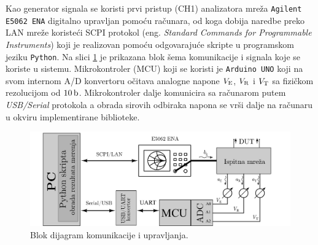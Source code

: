 \documentclass[a4paper, 12pt, diplomski]{etf}
\renewcommand{\unit}[1]{\,{\rm #1}}   %
\begin{document}
%
Kao generator signala se koristi prvi pristup (CH1)
analizatora mreža 
 \texttt{Agilent E5062 ENA} digitalno upravljan pomoću računara, od koga dobija naredbe 
 preko LAN mreže koristeći SCPI protokol (eng. \textit{Standard Commands for Programmable Instruments}) koji je realizovan pomoću odgovarajuće 
 skripte u programskom jeziku \texttt{Python}. Na slici \ref{fig:sna_complete_comm} je prikazana blok šema komunikacije i signala 
 koje se koriste u sistemu. Mikrokontroler (MCU)
 koji se koristi je
 \texttt{Arduino UNO} koji na svom internom A/D konvertoru 
 očitava analogne napone $V_{\rm E}$, $V_{\rm R}$ i $V_{\rm T}$
 sa fizičkom rezolucijom od $10\unit{b}$.
% 
Mikrokontroler dalje komunicira sa računarom putem 
\textit{USB/Serial} protokola a obrada sirovih odbiraka napona se vrši dalje na računaru u okviru 
implementirane biblioteke.

\begin{figure}[ht!]
    \centering
    \includegraphics[width=158.95000mm]{fig/BLOK.png}
    \caption{Blok dijagram komunikacije i upravljanja.}
    \label{fig:sna_complete_comm}
\end{figure}
\end{document}
